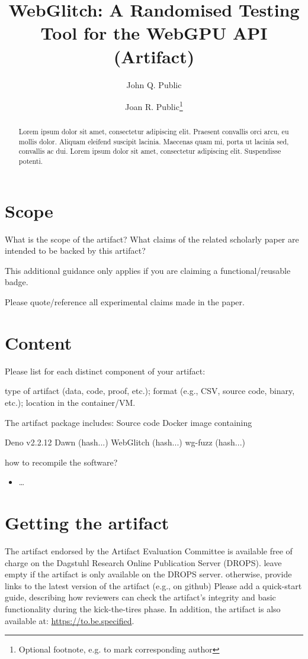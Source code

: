 \documentclass[a4paper,UKenglish]{darts-v2021}
\title{WebGlitch: A Randomised Testing Tool for the WebGPU API (Artifact)} %
\author{John Q. Public}{Dummy University Computing Laboratory, [optional: Address], Country \and My second affiliation, Country \and \url{http://www.myhomepage.edu} }{johnqpublic@dummyuni.org}{https://orcid.org/0000-0002-1825-0097}{(Optional) author-specific funding acknowledgements}%
\author{Joan R. Public\footnote{Optional footnote, e.g. to mark corresponding author}}{Department of Informatics, Dummy College, [optional: Address], Country}{joanrpublic@dummycollege.org}{[orcid]}{[funding]}
\newenvironment{scope}{\section{Scope}}{}
\newenvironment{content}{\section{Content}}{}
\newenvironment{getting}{\section{Getting the artifact} The artifact 
endorsed by the Artifact Evaluation Committee is available free of 
charge on the Dagstuhl Research Online Publication Server (DROPS).}{}
\begin{document}
\maketitle

\begin{abstract}
Lorem ipsum dolor sit amet, consectetur adipiscing elit. Praesent convallis orci arcu, eu mollis dolor. Aliquam eleifend suscipit lacinia. Maecenas quam mi, porta ut lacinia sed, convallis ac dui. Lorem ipsum dolor sit amet, consectetur adipiscing elit. Suspendisse potenti. 
 \end{abstract}


\begin{scope}
What is the scope of the artifact? What claims of the related scholarly paper are intended to be backed by this artifact?

This additional guidance only applies if you are claiming a functional/reusable badge.

Please quote/reference all experimental claims made in the paper.
\end{scope}

\begin{content}
    Please list for each distinct component of your artifact:

    type of artifact (data, code, proof, etc.);
    format (e.g., CSV, source code, binary, etc.);
    location in the container/VM.

The artifact package includes:
Source code 
Docker image containing 

Deno v2.2.12
Dawn (hash...)
WebGlitch (hash...)
wg-fuzz (hash...)

how to recompile the software?
\begin{itemize}
\item \dots
\end{itemize}
\end{content}

\begin{getting}
leave empty if the artifact is only available on the DROPS server.
otherwise, provide links to the latest version of the artifact (e.g., on github)
Please add a quick-start guide, describing how reviewers can check the artifact's integrity and basic functionality during the kick-the-tires phase.
In addition, the artifact is also available at:
\url{https://to.be.specified}.
\end{getting}
\end{document}
